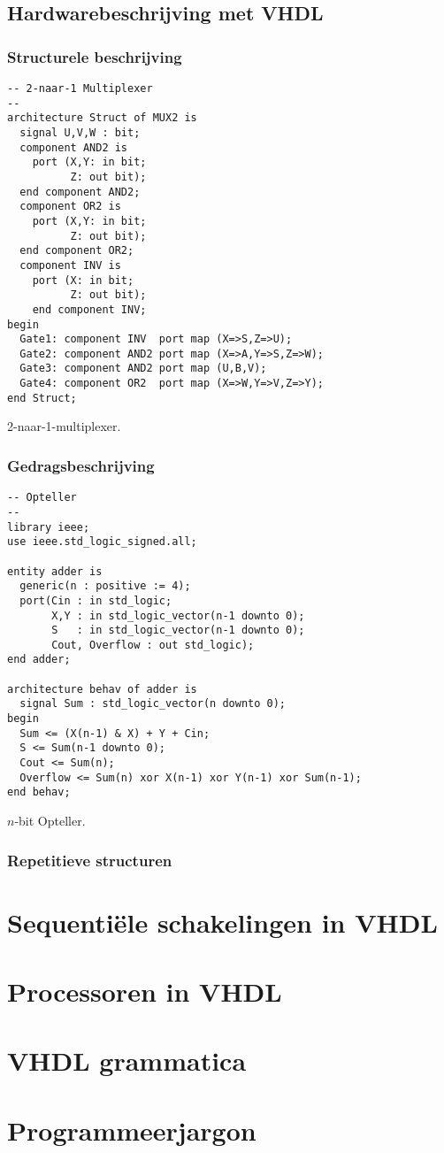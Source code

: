 \subsection{Hardwarebeschrijving met VHDL}
\subsubsection{Structurele beschrijving}
\begin{vhdlcode}[hbt]
\centering
\begin{lstlisting}
-- 2-naar-1 Multiplexer
--
architecture Struct of MUX2 is
  signal U,V,W : bit;
  component AND2 is
    port (X,Y: in bit;
          Z: out bit);
  end component AND2;
  component OR2 is
    port (X,Y: in bit;
          Z: out bit);
  end component OR2;
  component INV is
    port (X: in bit;
          Z: out bit);
    end component INV;
begin
  Gate1: component INV  port map (X=>S,Z=>U);
  Gate2: component AND2 port map (X=>A,Y=>S,Z=>W);
  Gate3: component AND2 port map (U,B,V);
  Gate4: component OR2  port map (X=>W,Y=>V,Z=>Y);
end Struct;
\end{lstlisting}
\caption{2-naar-1-multiplexer.}
\label{vhdl:bToAMultiplexer}
\end{vhdlcode}
\subsubsection{Gedragsbeschrijving}
\begin{vhdlcode}[hbt]
\centering
\begin{lstlisting}
-- Opteller
--
library ieee;
use ieee.std_logic_signed.all;

entity adder is
  generic(n : positive := 4);
  port(Cin : in std_logic;
       X,Y : in std_logic_vector(n-1 downto 0);
       S   : in std_logic_vector(n-1 downto 0);
       Cout, Overflow : out std_logic);
end adder;

architecture behav of adder is
  signal Sum : std_logic_vector(n downto 0);
begin
  Sum <= (X(n-1) & X) + Y + Cin;
  S <= Sum(n-1 downto 0);
  Cout <= Sum(n);
  Overflow <= Sum(n) xor X(n-1) xor Y(n-1) xor Sum(n-1);
end behav;
\end{lstlisting}
\caption{$n$-bit Opteller.}
\label{vhdl:adder}
\end{vhdlcode}
\subsubsection{Repetitieve structuren}
\section{Sequenti\"ele schakelingen in VHDL}
\section{Processoren in VHDL}
\section{VHDL grammatica}
\section{Programmeerjargon}
